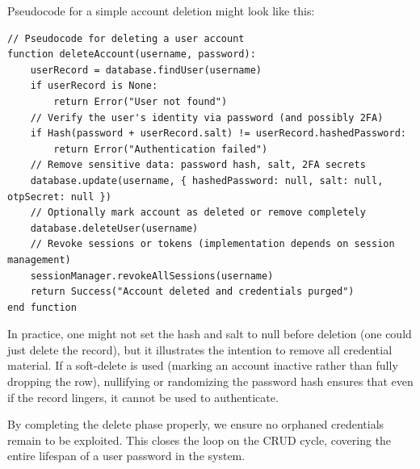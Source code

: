 \documentclass[11pt]{article}
\begin{document}
Pseudocode for a simple account deletion might look like this:

\begin{lstlisting}
// Pseudocode for deleting a user account
function deleteAccount(username, password):
    userRecord = database.findUser(username)
    if userRecord is None:
        return Error("User not found")
    // Verify the user's identity via password (and possibly 2FA)
    if Hash(password + userRecord.salt) != userRecord.hashedPassword:
        return Error("Authentication failed")
    // Remove sensitive data: password hash, salt, 2FA secrets
    database.update(username, { hashedPassword: null, salt: null, otpSecret: null })
    // Optionally mark account as deleted or remove completely
    database.deleteUser(username)
    // Revoke sessions or tokens (implementation depends on session management)
    sessionManager.revokeAllSessions(username)
    return Success("Account deleted and credentials purged")
end function
\end{lstlisting}

In practice, one might not set the hash and salt to null before deletion (one could just delete the record), but it illustrates the intention to remove all credential material. If a soft-delete is used (marking an account inactive rather than fully dropping the row), nullifying or randomizing the password hash ensures that even if the record lingers, it cannot be used to authenticate.

By completing the delete phase properly, we ensure no orphaned credentials remain to be exploited. This closes the loop on the CRUD cycle, covering the entire lifespan of a user password in the system.
\end{document}
